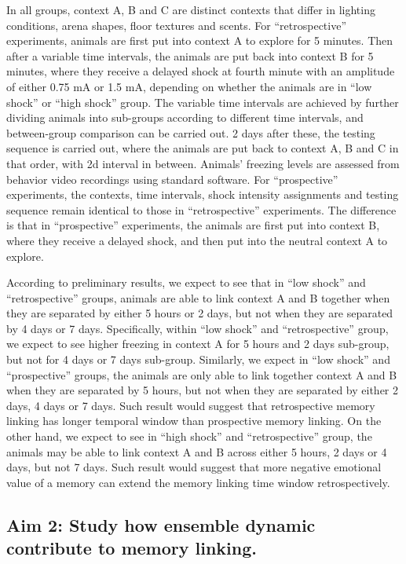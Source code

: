 \documentclass[master.tex]{subfiles}
\begin{document}
In all groups, context A, B and C are distinct contexts that differ in lighting
conditions, arena shapes, floor textures and scents. For ``retrospective''
experiments, animals are first put into context A to explore for 5 minutes. Then
after a variable time intervals, the animals are put back into context B for 5
minutes, where they receive a delayed shock at fourth minute with an amplitude
of either 0.75 mA or 1.5 mA, depending on whether the animals are in ``low
shock'' or ``high shock'' group. The variable time intervals are achieved by
further dividing animals into sub-groups according to different time intervals,
and between-group comparison can be carried out. 2 days after these, the testing
sequence is carried out, where the animals are put back to context A, B and C in
that order, with 2d interval in between. Animals' freezing levels are assessed
from behavior video recordings using standard software. For ``prospective''
experiments, the contexts, time intervals, shock intensity assignments and
testing sequence remain identical to those in ``retrospective'' experiments. The
difference is that in ``prospective'' experiments, the animals are first put
into context B, where they receive a delayed shock, and then put into the
neutral context A to explore.

According to preliminary results, we expect to see that in ``low shock'' and
``retrospective'' groups, animals are able to link context A and B together when
they are separated by either 5 hours or 2 days, but not when they are separated
by 4 days or 7 days. Specifically, within ``low shock'' and ``retrospective''
group, we expect to see higher freezing in context A for 5 hours and 2 days
sub-group, but not for 4 days or 7 days sub-group. Similarly, we expect in ``low
shock'' and ``prospective'' groups, the animals are only able to link together
context A and B when they are separated by 5 hours, but not when they are
separated by either 2 days, 4 days or 7 days. Such result would suggest that
retrospective memory linking has longer temporal window than prospective memory
linking. On the other hand, we expect to see in ``high shock'' and
``retrospective'' group, the animals may be able to link context A and B across
either 5 hours, 2 days or 4 days, but not 7 days. Such result would suggest that
more negative emotional value of a memory can extend the memory linking time
window retrospectively.

\subsection*{Aim 2: Study how ensemble dynamic contribute to memory linking.}
\end{document}
